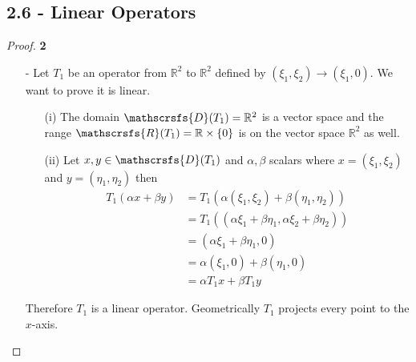 \documentclass[11pt]{article}
\newcommand{\R}{\mathbb{R}}
\newcommand{\dom}{\mathscrsfs{D}}
\theoremstyle{definition}
\begin{document}
\subsection*{2.6 - Linear Operators}
\begin{proof}{\textbf{2}}
\begin{itemize}
    \item[-]
    Let $T_1$ be an operator from $\R^2$ to $\R^2$ defined by
    $(\xi_1, \xi_2) \to (\xi_1, 0)$. We want to prove it is linear.
    \begin{itemize}
        \item [(i)] The domain $\mathscrsfs{D}(T_1) = \R^2$ is a vector space
        and the range $\mathscrsfs{R}(T_1) = \R \times \{0\}$ is on the
        vector space $\R^2$ as well.
        \item [(ii)] Let $x,y \in \dom(T_1)$ and $\alpha,\beta$ scalars
        where $x = (\xi_1, \xi_2)$ and $y = (\eta_1, \eta_2)$ then
        \begin{align*}
            T_1(\alpha x + \beta y)
            &= T_1(\alpha(\xi_1, \xi_2) + \beta(\eta_1, \eta_2))\\
            &= T_1((\alpha\xi_1 + \beta\eta_1, \alpha\xi_2 + \beta\eta_2))\\
            &= (\alpha\xi_1 + \beta\eta_1, 0)\\
            &= \alpha(\xi_1, 0) + \beta(\eta_1, 0)\\
            &= \alpha T_1x + \beta T_1y
        \end{align*}
    \end{itemize}
    Therefore $T_1$ is a linear operator. Geometrically $T_1$ projects every
    point to the $x$-axis.


\end{itemize}
\end{proof}
\end{document}
